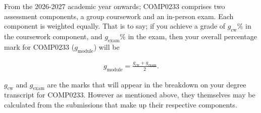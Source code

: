 \documentclass[10pt, a4paper]{article}
\def\moduleGrade{g_{\mathrm{module}}}
\def\examGrade{g_{\mathrm{exam}}}
\def\courseworkGrade{g_{\mathrm{cw}}}
\begin{document}
From the 2026-2027 academic year onwards; COMP0233 comprises two assessment components, a group coursework and an in-person exam.
Each component is weighted equally.
That is to say; if you achieve a grade of $\courseworkGrade \%$ in the coursework component, and $\examGrade \%$ in the exam, then your overall percentage mark for COMP0233 ($\moduleGrade$) will be

\begin{align*}
  \moduleGrade = \frac{\courseworkGrade + \examGrade}{2}.
\end{align*}

$\courseworkGrade$ and $\examGrade$ are the marks that will appear in the breakdown on your degree transcript for COMP0233.
However as mentioned above, they themselves may be calculated from the submissions that make up their respective components.




\end{document}
